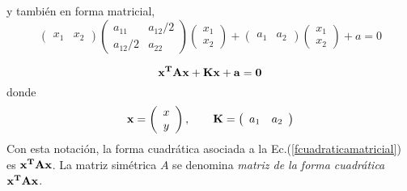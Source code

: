 \noindent
y también  en forma matricial,
\begin{equation}
\left(\begin{array}{cc}x_1 & x_2
\end{array}
 \right) \left(\begin{array}{cc} a_{11} & a_{12}/2  \\a_{12}/2 & a_{22}
\end{array}
 \right)  \left(\begin{array}{c} x_1 \\  x_2
\end{array}
 \right)+ \left(\begin{array}{cc}a_1 & a_2
\end{array}
 \right) \left(\begin{array}{c} x_1 \\ x_2
\end{array}
 \right) +a=0\label{fcuadraticatoda}
\end{equation}

\bigskip

\begin{equation}
\bf x ^T A \bf x + K \bf x + a =0 \label{fcuadraticamatricial}
\end{equation}
\noindent
donde 
\begin{equation}
\bf x=  \left(\begin{array}{c} x \\y
\end{array}
 \right),\qquad K=\left(\begin{array}{cc}a_1 & a_2
\end{array}
 \right)\label{fcuadraticaxyk}
\end{equation}
Con esta notación, la forma cuadrática asociada a la Ec.(\ref{fcuadraticamatricial}) es $ \bf x ^T A \bf x$. La matriz simétrica $A$ se denomina \textit{matriz de la forma cuadrática } $ \bf x ^T A \bf x$. 

\bigskip

